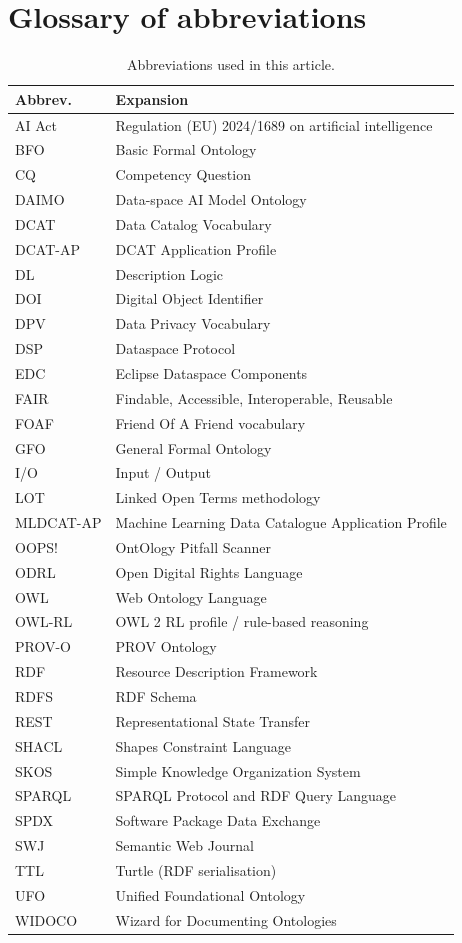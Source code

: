 \documentclass[Afour,sagev,times]{sagej}
\begin{document}
\section{Glossary of abbreviations}\label{app:glossary}

\begin{table}[h]
\small\sf\centering
\caption{Abbreviations used in this article.\label{tab:glossary}}
\begin{tabular}{@{}p{2.2cm}p{5.3cm}@{}}
\toprule
\textbf{Abbrev.} & \textbf{Expansion} \\
\midrule
AI Act & Regulation (EU) 2024/1689 on artificial intelligence \\
BFO & Basic Formal Ontology \\
CQ & Competency Question \\
DAIMO & Data-space AI Model Ontology \\
DCAT & Data Catalog Vocabulary \\
DCAT-AP & DCAT Application Profile \\
DL & Description Logic \\
DOI & Digital Object Identifier \\
DPV & Data Privacy Vocabulary \\
DSP & Dataspace Protocol \\
EDC & Eclipse Dataspace Components \\
FAIR & Findable, Accessible, Interoperable, Reusable \\
FOAF & Friend Of A Friend vocabulary \\
GFO & General Formal Ontology \\
I/O & Input / Output \\
LOT & Linked Open Terms methodology \\
MLDCAT-AP & Machine Learning Data Catalogue Application Profile \\
OOPS! & OntOlogy Pitfall Scanner \\
ODRL & Open Digital Rights Language \\
OWL & Web Ontology Language \\
OWL-RL & OWL 2 RL profile / rule-based reasoning \\
PROV-O & PROV Ontology \\
RDF & Resource Description Framework \\
RDFS & RDF Schema \\
REST & Representational State Transfer \\
SHACL & Shapes Constraint Language \\
SKOS & Simple Knowledge Organization System \\
SPARQL & SPARQL Protocol and RDF Query Language \\
SPDX & Software Package Data Exchange \\
SWJ & Semantic Web Journal \\
TTL & Turtle (RDF serialisation) \\
UFO & Unified Foundational Ontology \\
WIDOCO & Wizard for Documenting Ontologies \\
\bottomrule
\end{tabular}
\end{table}
\end{document}
